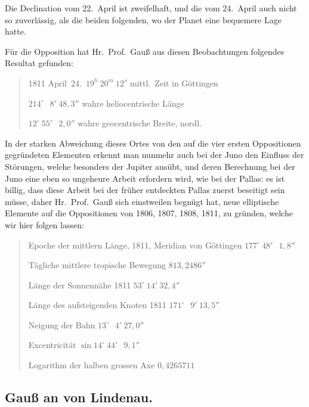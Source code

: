 \documentclass[12pt,a4paper]{book}
\begin{document}
Die Declination vom 22.~April ist zweifelhaft, und die vom 24.~April auch nicht so zuverl\"assig, als die beiden folgenden, wo der Planet eine bequemere Lage hatte.

F\"ur die Opposition hat Hr.~Prof.~Gau{\ss} aus diesen Beobachtungen folgendes Resultat gefunden:

\begin{quote}
1811 April~24.\ $19^{h}\ 20^{m}\ 12^{s}$ mittl.~Zeit in G\"ottingen

$214^{\circ}\ \phantom{0}8'\ 48{,}3''$ \quad wahre heliocentrische L\"ange

$12^{\circ}\ 55'\ \phantom{0}2{,}0''$ \quad wahre geocentrische Breite, nordl.
\end{quote}

In der starken Abweichung dieses Ortes von den auf die vier ersten Oppositionen gegr\"undeten Elementen erkennt man nunmehr auch bei der Juno den Einfluss der St\"orungen, welche besonders der Jupiter aus\"ubt, und deren Berechnung bei der Juno eine eben so ungeheure Arbeit erfordern wird, wie bei der Pallas: es ist billig, dass diese Arbeit bei der fr\"uher entdeckten Pallas zuerst beseitigt sein m\"usse, daher Hr.~Prof.~Gau{\ss} sich einstweilen begn\"ugt hat, neue elliptische Elemente auf die Oppositionen von 1806, 1807, 1808, 1811, zu gr\"unden, welche wir hier folgen lassen:

\begin{quote}
Epoche der mittlern L\"ange, 1811, Meridian von G\"ottingen \dotfill $177^{\circ}\ 48'\ \phantom{0}1{,}8''$

T\"agliche mittlere tropische Bewegung \dotfill $813{,}2486''$

L\"ange der Sonnenn\"ahe 1811 \dotfill $53^{\circ}\ 14'\ 32{,}4''$

L\"ange des aufsteigenden Knoten 1811 \dotfill $171^{\circ}\ \phantom{0}9'\ 13{,}5''$

Neigung der Bahn \dotfill $13^{\circ}\ \phantom{0}4'\ 27{,}0''$

Excentricit\"at \dotfill $\sin 14^{\circ}\ 44'\ \phantom{0}9{,}1''$

Logarithm der halben grossen Axe \dotfill $0{,}4265711$
\end{quote}


\newpage
\subsection*{Gau{\ss} an von Lindenau.}
\end{document}
